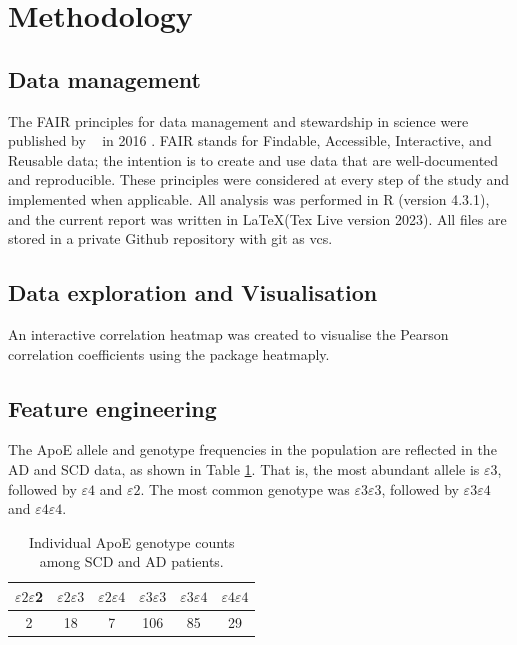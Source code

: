 \documentclass{amsart}
\theoremstyle{plain}
\begin{document}
\section{Methodology}
\subsection{Data management}
The FAIR principles for data management and stewardship in science were published by  ~\citeauthor{Wilkinson2016TheStewardship} in 2016 \cite{Wilkinson2016TheStewardship}. FAIR stands for Findable, Accessible, Interactive, and Reusable data; the intention is to create and use data that are well-documented and reproducible. These principles were considered at every step of the study and implemented when applicable. All analysis was performed in R (version 4.3.1), and the current report was written in \LaTeX (Tex Live version 2023). All files are stored in a private Github repository with git as \acrfull{vcs}.

\subsection{Data exploration and Visualisation}
An interactive correlation heatmap was created to visualise the Pearson correlation coefficients using the package \textsf{heatmaply}. 

\subsection{Feature engineering}
The ApoE allele and genotype frequencies in the population are reflected in the AD and SCD data, as shown in Table \ref{Table:ApoEgenfreq}. That is, the most abundant allele is $\varepsilon$3, followed by $\varepsilon4$ and $\varepsilon2$. The most common genotype was $\varepsilon3\varepsilon3$, followed by $\varepsilon3\varepsilon4$ and $\varepsilon4\varepsilon4$.

\begin{table}[h!]
\begin{tabular}{cccccc} \toprule
$\varepsilon2\varepsilon$2 & $\varepsilon2\varepsilon3$ & $\varepsilon2\varepsilon4$ & $\varepsilon3\varepsilon3$ & $\varepsilon3\varepsilon4$ & $\varepsilon4\varepsilon4$ \\ \midrule
2    & 18   & 7    & 106  & 85   & 29   \\ \bottomrule
\end{tabular}
\caption{Individual ApoE genotype counts among SCD and AD patients.} \label{Table:ApoEgenfreq}
\end{table}
\end{document}
